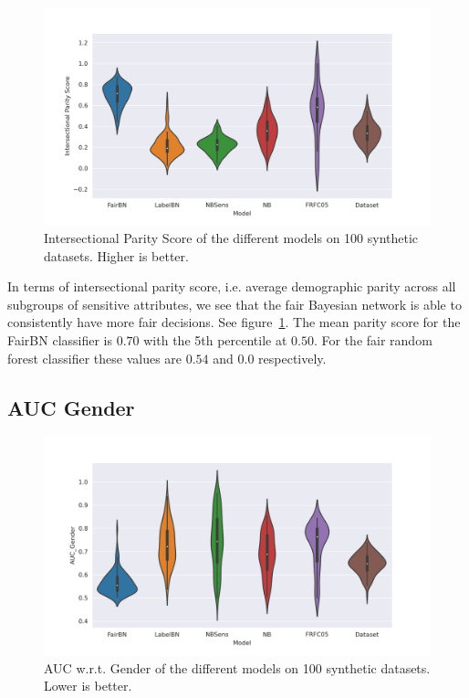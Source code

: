 \begin{figure}
    \centering
    \includegraphics[width=\linewidth]{figures/intparscore-synthetic.png}
    \caption{Intersectional Parity Score of the different models on 100 synthetic datasets. Higher is better.}
    \label{fig:intpar}
\end{figure}

In terms of intersectional parity score, i.e. average demographic parity across all subgroups of sensitive attributes, we see that the fair Bayesian network is able to consistently have more fair decisions. See figure~\ref{fig:intpar}. The mean parity score for the FairBN classifier is $0.70$ with the 5th percentile at $0.50$. For the fair random forest classifier these values are $0.54$ and $0.0$ respectively.
 
\subsection{AUC Gender}

\begin{figure}
    \centering
    \includegraphics[width=\linewidth]{figures/aucg-synthetic.png}
    \caption{AUC w.r.t. Gender of the different models on 100 synthetic datasets. Lower is better.}
    \label{fig:aucgender}
\end{figure}

